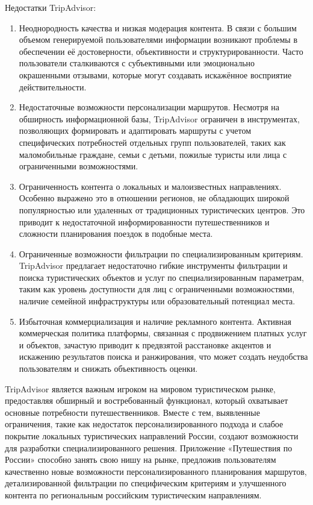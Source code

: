 \noindent Недостатки TripAdvisor:
\begin{enumerate}
    \item Неоднородность качества и низкая модерация контента. В связи с большим объемом генерируемой пользователями информации возникают проблемы в обеспечении её достоверности, объективности и структурированности. Часто пользователи сталкиваются с субъективными или эмоционально окрашенными отзывами, которые могут создавать искажённое восприятие действительности.
    \item Недостаточные возможности персонализации маршрутов. Несмотря на обширность информационной базы, TripAdvisor ограничен в инструментах, позволяющих формировать и адаптировать маршруты с учетом специфических потребностей отдельных групп пользователей, таких как маломобильные граждане, семьи с детьми, пожилые туристы или лица с ограниченными возможностями.
    \item Ограниченность контента о локальных и малоизвестных направлениях. Особенно выражено это в отношении регионов, не обладающих широкой популярностью или удаленных от традиционных туристических центров. Это приводит к недостаточной информированности путешественников и сложности планирования поездок в подобные места.
    \item Ограниченные возможности фильтрации по специализированным критериям. TripAdvisor предлагает недостаточно гибкие инструменты фильтрации и поиска туристических объектов и услуг по специализированным параметрам, таким как уровень доступности для лиц с ограниченными возможностями, наличие семейной инфраструктуры или образовательный потенциал места.
    \item Избыточная коммерциализация и наличие рекламного контента. Активная коммерческая политика платформы, связанная с продвижением платных услуг и объектов, зачастую приводит к предвзятой расстановке акцентов и искажению результатов поиска и ранжирования, что может создать неудобства пользователям и снижать объективность оценки.
\end{enumerate}

\noindent TripAdvisor является важным игроком на мировом туристическом рынке, предоставляя обширный и востребованный функционал, который охватывает основные потребности путешественников. Вместе с тем, выявленные ограничения, такие как недостаток персонализированного подхода и слабое покрытие локальных туристических направлений России, создают возможности для разработки специализированного решения. Приложение «Путешествия по России» способно занять свою нишу на рынке, предложив пользователям качественно новые возможности персонализированного планирования маршрутов, детализированной фильтрации по специфическим критериям и улучшенного контента по региональным российским туристическим направлениям.


